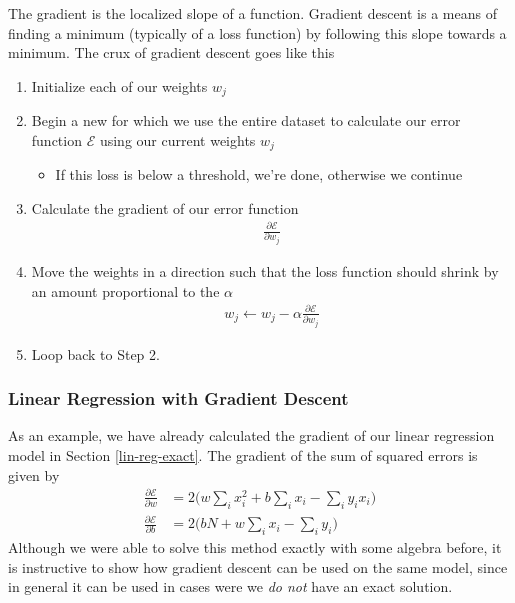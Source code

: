The gradient is the localized slope of a function. Gradient descent is a means of finding a minimum (typically of a loss function) by following this slope towards a minimum. The crux of gradient descent goes like this
\begin{enumerate}
    \item Initialize each of our weights $w_j$
    \item Begin a new  for which we use the entire dataset to calculate our error function $\mathcal{E}$ using our current weights $w_j$
    \begin{itemize}
    \item If this loss is below a threshold, we're done, otherwise we continue    
    \end{itemize}
    \item Calculate the gradient of our error function 
    \begin{align}
        \frac{\partial \mathcal{E}}{\partial w_j}
    \end{align}
    \item Move the weights in a direction such that the loss function should shrink by an amount proportional to the  $\alpha$
    \begin{align}
        w_j \leftarrow w_j - \alpha\frac{\partial \mathcal{E}}{\partial w_j}
    \end{align}
    \item Loop back to Step 2.
\end{enumerate}

\subsubsection{Linear Regression with Gradient Descent}

 As an example, we have already calculated the gradient of our linear regression model in Section \ref{lin-reg-exact}. The gradient of the sum of squared errors is given by
\begin{align}
    \frac{\partial \mathcal{E}}{\partial w} &= 2\Big(w\sum_ix_i^2 + b\sum_i x_i -\sum_i y_i x_i\Big)\label{grad_sse_w}\\
    \frac{\partial \mathcal{E}}{\partial b} &= 2\Big(bN + w \sum_i x_i - \sum_i y_i \Big)\label{grad_sse_b}
\end{align}
Although we were able to solve this method exactly with some algebra before, it is instructive to show how gradient descent can be used on the same model, since in general it can be used in cases were we \emph{do not} have an exact solution.

